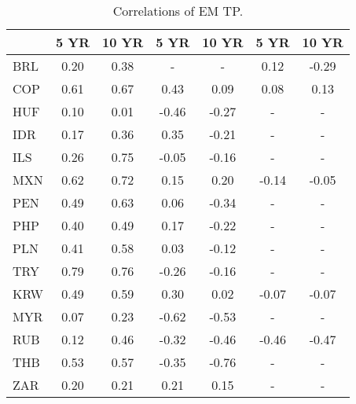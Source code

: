 \begin{tiny}\begin{table}\centering\begin{tabular}{l|cccccc}\toprule & 5 YR & 10 YR & 5 YR & 10 YR & 5 YR & 10 YR \\\midrule BRL & 0.20 & 0.38 & - & - & 0.12 & -0.29 \\COP & 0.61 & 0.67 & 0.43 & 0.09 & 0.08 & 0.13 \\HUF & 0.10 & 0.01 & -0.46 & -0.27 & - & - \\IDR & 0.17 & 0.36 & 0.35 & -0.21 & - & - \\ILS & 0.26 & 0.75 & -0.05 & -0.16 & - & - \\MXN & 0.62 & 0.72 & 0.15 & 0.20 & -0.14 & -0.05 \\PEN & 0.49 & 0.63 & 0.06 & -0.34 & - & - \\PHP & 0.40 & 0.49 & 0.17 & -0.22 & - & - \\PLN & 0.41 & 0.58 & 0.03 & -0.12 & - & - \\TRY & 0.79 & 0.76 & -0.26 & -0.16 & - & - \\KRW & 0.49 & 0.59 & 0.30 & 0.02 & -0.07 & -0.07 \\MYR & 0.07 & 0.23 & -0.62 & -0.53 & - & - \\RUB & 0.12 & 0.46 & -0.32 & -0.46 & -0.46 & -0.47 \\THB & 0.53 & 0.57 & -0.35 & -0.76 & - & - \\ZAR & 0.20 & 0.21 & 0.21 & 0.15 & - & - \\\bottomrule\end{tabular}\caption{Correlations of EM TP.}\label{table:Correls}\end{table}\end{tiny}